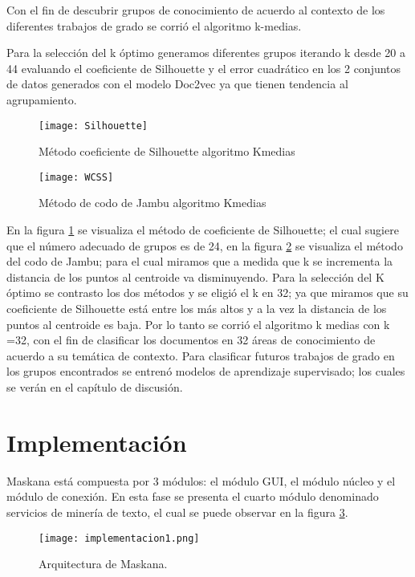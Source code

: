 Con el fin de descubrir grupos de conocimiento de acuerdo al contexto de los diferentes trabajos de grado se corrió el algoritmo k-medias.

Para la selección del k óptimo generamos diferentes grupos iterando k desde 20 a 44 evaluando el coeficiente de Silhouette y el error cuadrático en los 2 conjuntos de datos generados con el modelo Doc2vec ya que tienen tendencia al agrupamiento.


\begin{figure}[H]
\texttt{[image: Silhouette]}
\caption{Método coeficiente de Silhouette algoritmo Kmedias }
\label{fig:proceso3}
\end{figure}

\begin{figure}[H]
\texttt{[image: WCSS]}
\caption{Método de codo de Jambu algoritmo Kmedias}
\label{fig:proceso4}
\end{figure}

En la figura  \ref{fig:proceso3} se visualiza el método de coeficiente de Silhouette; el cual sugiere que el número adecuado de grupos es de 24, en la figura  \ref{fig:proceso4} se visualiza el método del codo de Jambu; 
para el cual miramos que a medida que k se incrementa la distancia de los puntos al centroide va disminuyendo. Para la selección del K óptimo  se contrasto los dos métodos y se eligió el k en 32; ya que miramos que su coeficiente de Silhouette está entre los más altos y a la vez la distancia de los puntos al centroide es baja. Por lo tanto se corrió el algoritmo k medias con k =32, con el fin de clasificar los documentos en 32 áreas de conocimiento de acuerdo a su temática de contexto. Para clasificar futuros trabajos de grado en los grupos encontrados se entrenó modelos de aprendizaje supervisado; los cuales se verán en el capítulo de discusión.




\section{Implementación}


Maskana está compuesta por 3 módulos: el módulo GUI, el módulo núcleo y el módulo de conexión. En esta fase se presenta el cuarto módulo denominado servicios de minería de texto, el cual se puede observar en la figura \ref{fig:implementacion1}.


\begin{figure}[H]
\texttt{[image: implementacion1.png]}
\caption{Arquitectura de Maskana.}
\label{fig:implementacion1}
\end{figure}

